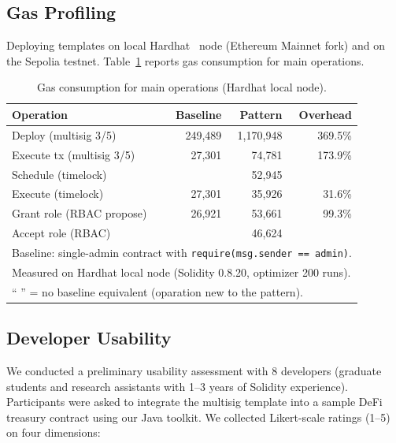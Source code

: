 \documentclass[conference]{IEEEtran}
\begin{document}
\subsection{Gas Profiling}

Deploying templates on local Hardhat~\cite{hardhat2024} node
(Ethereum Mainnet fork) and on the Sepolia testnet.
Table~\ref{tab:gas} reports gas consumption for main operations.

\begin{table}[!t]
\centering
\caption{Gas consumption for main operations (Hardhat local node).}
\label{tab:gas}
\small
\begin{tabular}{l r r r}
\toprule
\textbf{Operation} & \textbf{Baseline} & \textbf{Pattern} & \textbf{Overhead} \\
\midrule
Deploy (multisig 3/5)     & 249,489 & 1,170,948 & 369.5\% \\
Execute tx (multisig 3/5) & 27,301  & 74,781    & 173.9\% \\
Schedule (timelock)       &       & 52,945    &   \\
Execute (timelock)        & 27,301  & 35,926    & 31.6\% \\
Grant role (RBAC propose) & 26,921  & 53,661    & 99.3\% \\
Accept role (RBAC)        &       & 46,624    &   \\
\bottomrule
\multicolumn{4}{l}{\footnotesize Baseline: single-admin contract with \texttt{require(msg.sender == admin)}.}\\
\multicolumn{4}{l}{\footnotesize Measured on Hardhat local node (Solidity 0.8.20, optimizer 200 runs).}\\
\multicolumn{4}{l}{\footnotesize `` '' = no baseline equivalent (oparation new to the pattern).}
\end{tabular}
\end{table}

\subsection{Developer Usability}

We conducted a preliminary usability assessment with 8
developers (graduate students and research assistants with 1--3 years
of Solidity experience).  Participants were asked to integrate the
multisig template into a sample DeFi treasury contract using our Java
toolkit.  We collected Likert-scale ratings (1--5) on four dimensions:
\end{document}
